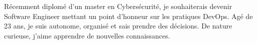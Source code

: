 
\begin{cvparagraph}
    Récemment diplomé d'un master en Cybersécurité, je souhaiterais devenir Software Engineer mettant un point d'honneur sur les pratiques DevOps. 
    Agé de 23 ans, je suis autonome, organisé et sais prendre des décisions. De nature curieuse, j'aime apprendre de nouvelles connaissances.
\end{cvparagraph}
